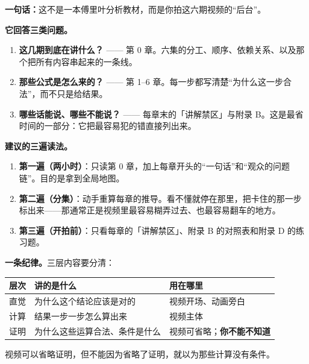 \documentclass[11pt,fontset=none,a4paper,oneside]{ctexbook}
\theoremstyle{definition}
\theoremstyle{plain}
\theoremstyle{remark}
\numberwithin{equation}{chapter}
\begin{document}
\frontmatter
\thispagestyle{plain}
\vspace*{0.5cm}

\begin{ideabox}
\small
\textbf{一句话：}这不是一本傅里叶分析教材，而是你拍这六期视频的“后台”。

\vspace{0.4em}
\textbf{它回答三类问题。}
\begin{enumerate}[leftmargin=1.6em,itemsep=0.25em,topsep=0.3em]
\item \textbf{这几期到底在讲什么？} —— 第 0 章。六集的分工、顺序、依赖关系、以及那个把所有内容串起来的一条线。
\item \textbf{那些公式是怎么来的？} —— 第 1--6 章。每一步都写清楚“为什么这一步合法”，而不只是给结果。
\item \textbf{哪些话能说、哪些不能说？} —— 每章末的「讲解禁区」与附录 B。这是最省时间的一部分：它把最容易犯的错直接列出来。
\end{enumerate}

\vspace{0.4em}
\textbf{建议的三遍读法。}
\begin{enumerate}[leftmargin=1.6em,itemsep=0.25em,topsep=0.3em]
\item \textbf{第一遍（两小时）}：只读第 0 章，加上每章开头的“一句话”和“观众的问题链”。目的是拿到全局地图。
\item \textbf{第二遍（分集）}：动手重算每章的推导。看不懂就停在那里，把卡住的那一步标出来——那通常正是视频里最容易糊弄过去、也最容易翻车的地方。
\item \textbf{第三遍（开拍前）}：只看每章的「讲解禁区」、附录 B 的对照表和附录 D 的练习题。
\end{enumerate}

\vspace{0.4em}
\textbf{一条纪律。}三层内容要分清：
\begin{center}
\small
\begin{tabular}{@{}L{2.0cm}L{5.3cm}L{5.4cm}@{}}
\toprule
层次 & 讲的是什么 & 用在哪里 \\
\midrule
直觉 & 为什么这个结论应该是对的 & 视频开场、动画旁白 \\
计算 & 结果一步一步怎么算出来 & 视频主体 \\
证明 & 为什么这些运算合法、条件是什么 & 视频可省略；\textbf{你不能不知道} \\
\bottomrule
\end{tabular}
\end{center}

视频可以省略证明，但不能因为省略了证明，就以为那些计算没有条件。
\end{ideabox}
\end{document}
